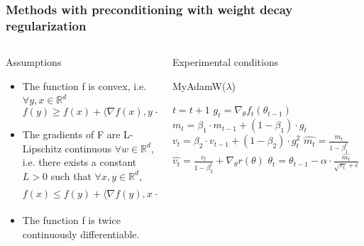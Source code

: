 \documentclass[aspectratio=169, 12pt]{beamer}
\begin{document}
\begin{frame}
	\frametitle{Methods with preconditioning with weight decay regularization}

	\begin{columns}
		\begin{column}{0.5\textwidth}
			\begin{block}{Assumptions}
				\begin{itemize}
				
					\item The function f is convex, i.e. $\forall y, x \in \mathbb{R}^d$
	\begin{equation*}
		f(y) \geq f(x) + \langle \nabla f(x), y-x \rangle
	\end{equation*}
                        \item The gradients of F are L-Lipschitz continuous $\forall w \in \mathbb{R}^d$, i.e. there exists a constant $L > 0$ such that $\forall x, y \in \mathbb{R}^d$,
	\begin{equation*}
		f(x) \leq f(y) + \langle \nabla f(y), x-y \rangle + \frac{L}{2} ||x - y||^2
	\end{equation*}
                        \item The function f is twice continuously differentiable.
                       
				\end{itemize}
			\end{block}		
		\end{column}
		
		\begin{column}{0.55\textwidth} 
	     	\begin{block}{Experimental conditions}
            \begin{algorithm}[H]
            
            \caption{MyAdamW($\lambda$)}\label{alg:Adam}
    
            \begin{algorithmic}
            \small{
            \State $t = t+1$
            \State $g_t = \nabla_{\theta} f_t(\theta_{t-1})$
            \State $m_t = \beta_1 \cdot m_{t-1} + (1 - \beta_1) \cdot g_t$
            \State $v_t = \beta_2 \cdot v_{t-1} + (1 - \beta_2) \cdot g_t^2$
            \State $\hat{m_t} = \frac{m_t}{1-\beta_1^t}$
            \State $\hat{v_t} = \frac{v_t}{1-\beta_2^t} +\nabla_{\theta} r(\theta)$
            \State $\theta_t = \theta_{t-1} - \alpha \cdot \frac{\hat{m_t}}{\sqrt{v_t} + \epsilon}$    \EndWhile
            }
\end{algorithmic}
\end{algorithm}


\end{block}
\end{column}
\end{columns}
\end{frame}
\end{document}
